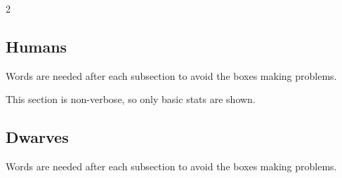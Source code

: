 \documentclass[a4paper,openany]{book}
\begin{document}
\begin{multicols}{2}

\subsection{Humans}
Words are needed after each subsection to avoid the boxes making problems.


\fightAdvert

\humanfarmer

\huntingdog

\humanweaver

\humansoldier


\humanarcher

\sunguard

\glsaddall

\humansoldier


\humanmaid

\humanmaid

This section is non-verbose, so only basic stats are shown.

\basilisk


\humanbard

\humanthief

\humanthief

\humantrader

\humantrader

\humanalchemist

\necromancer

\subsection{Dwarves}
Words are needed after each subsection to avoid the boxes making problems.




\dwarvensoldier

\dwarventrader

\dwarvenrunemaster


\end{multicols}
\end{document}
